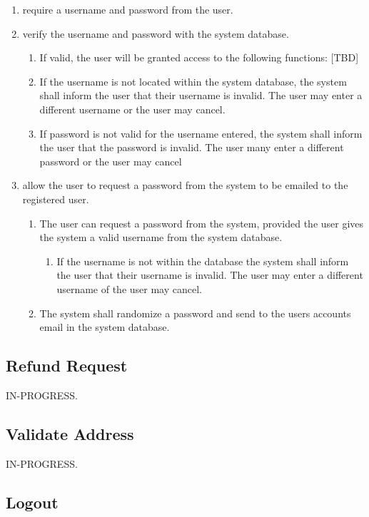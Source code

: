 \documentclass{scrreprt}
\begin{document}
\begin{enumerate}
\item require a username and password from the user.
\item verify the username and password with the system database.
\begin{enumerate}
\item If valid, the user will be granted access to the following functions:
[TBD]
\item If the username is not located within the system database, the system shall
inform the user that their username is invalid. The user may enter a different
username or the user may cancel.
\item If password is not valid for the username entered, the system shall inform the
user that the password is invalid. The user many enter a different password or
the user may cancel
\end{enumerate}
\item allow the user to request a password from the system to be emailed to the
registered user.
\begin{enumerate}
\item The user can request a password from the system, provided the user gives
the system a valid username from the system database.
\begin{enumerate}
\item If the username is not within the database the system shall inform the
user that their username is invalid. The user may enter a different username of
the user may cancel.
\end{enumerate}
\item The system shall randomize a password and send to the users accounts
email in the system database.
\end{enumerate}
\end{enumerate}

\subsection{Refund Request}

IN-PROGRESS.

\subsection{Validate Address}

IN-PROGRESS.

\subsection{Logout}
\end{document}
